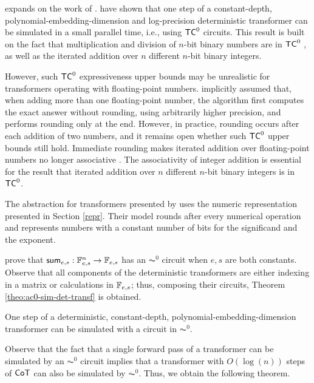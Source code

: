\citet{toyota} expands on the work of \citet{merrill2023parallelism}.
\citet{merrill2023parallelism} have shown that one step of a constant-depth, polynomial-embedding-dimension and log-precision deterministic transformer can be simulated in a small parallel time, i.e., using $\mathsf{TC}^0$ circuits.
This result is built on the fact that multiplication and division of $n$-bit binary numbers are in $\mathsf{TC}^0$ \citep{hesse2001division}, as well as the iterated addition over $n$ different $n$-bit binary integers.

However, such $\mathsf{TC}^0$ expressiveness upper bounds may be unrealistic for transformers operating with floating-point numbers. 
\citet{merrill2023parallelism} implicitly assumed that, when adding more than one floating-point number, the algorithm first computes the exact answer without rounding, using arbitrarily higher precision, and performs rounding only at the end.
However, in practice, rounding occurs after each addition of two numbers, and it remains open whether such $\mathsf{TC}^0$ upper bounds still hold.
Immediate rounding makes iterated addition over floating-point numbers no longer associative \citep{goldberg1991every}.
The associativity of integer addition is essential for the result that iterated addition over $n$ different $n$-bit binary integers is in $\mathsf{TC}^0$.

The abstraction for transformers presented by \citet{toyota} uses the numeric representation presented in Section \ref{repr}.
Their model rounds after every numerical operation and represents numbers with a constant number of bits for the significand and the exponent.

\citet{toyota} prove that $\mathsf{sum}_{e,s}:\mathbb{F}_{e,s}^n \to \mathbb{F}_{e,s}$ has an $\AC^0$ circuit when $e,s$ are both constants.
Observe that all components of the deterministic transformers are either indexing in a matrix or calculations in $\mathbb{F}_{e,s}$; thus, composing their circuits, Theorem \ref{theo:ac0-sim-det-transf} is obtained.


\begin{theorem}\label{theo:ac0-sim-det-transf}
    One step of a deterministic, constant-depth, polynomial-embedding-dimension transformer can be simulated with a circuit in $\AC^0$.
\end{theorem}

Observe that the fact that a single forward pass of a transformer can be simulated by an $\AC^0$ circuit implies that a transformer with $O(\log(n))$ steps of $\mathsf{CoT}$ can also be simulated by $\AC^0$.
Thus, we obtain the following theorem.

